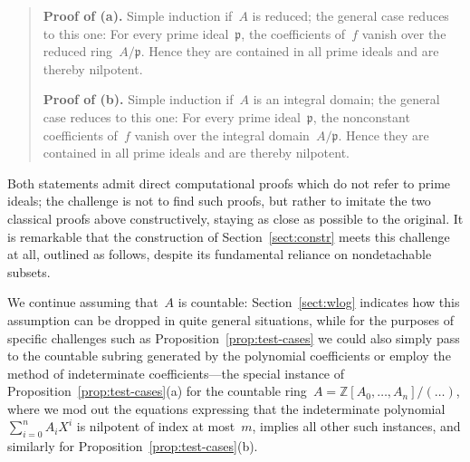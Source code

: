 \documentclass[com,11pt,crcready]{iosart2x}
\theoremstyle{definition}
\theoremstyle{plain}
\theoremstyle{remark}
\newcommand{\?}{\,{:}\,}
\newcommand{\ppp}{\mathfrak{p}}
\newcommand{\ZZ}{\mathbb{Z}}
\renewcommand{\_}{\mathpunct{.}\,}
\begin{document}
\begin{quote}\small
  \textbf{Proof of (a).} Simple induction if~$A$ is
  reduced; the general case reduces to this one: For every prime ideal~$\ppp$,
  the coefficients of~$f$ vanish over the reduced ring~$A/\ppp$. Hence they are
  contained in all prime ideals and are thereby
  nilpotent.\medskip

  \textbf{Proof of (b).} Simple induction if~$A$ is an
  integral domain; the general case reduces to this one: For every prime
  ideal~$\ppp$, the nonconstant coefficients of~$f$ vanish over the integral
  domain~$A/\ppp$. Hence they are contained in all prime ideals
  and are thereby nilpotent.
\end{quote}

Both statements admit direct computational proofs which do not
refer to prime ideals; the challenge is not to find such proofs, but rather to
imitate the two classical proofs above constructively, staying as close as
possible to the original. It is remarkable that the construction of
Section~\ref{sect:constr} meets this challenge at all, outlined as follows, despite its fundamental
reliance on nondetachable subsets.

We continue assuming that~$A$ is countable:
Section~\ref{sect:wlog} indicates how this assumption can be dropped in quite
general situations, while for the purposes of specific challenges such as Proposition~\ref{prop:test-cases} we could also
simply pass to the countable subring generated by the polynomial coefficients
or employ the method of indeterminate coefficients---the special instance of
Proposition~\ref{prop:test-cases}(a) for the countable ring~$A =
\ZZ[A_0,\ldots,A_n]/(\ldots)$, where we mod out the equations expressing that
the indeterminate polynomial~$\sum_{i=0}^n A_i X^i$ is nilpotent of
index at most~$m$, implies all other such instances, and similarly for
Proposition~\ref{prop:test-cases}(b).
\end{document}
